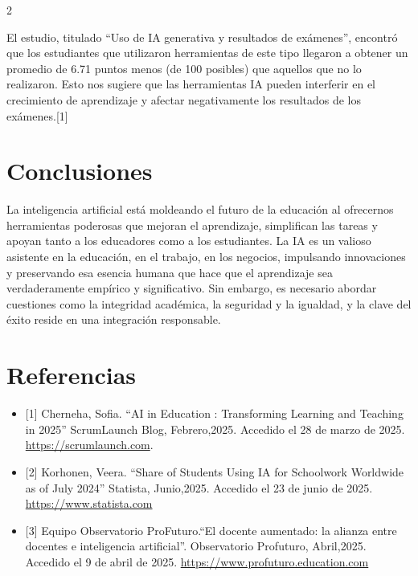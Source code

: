 \documentclass[12pt,spanish,Letterpaper,openany]{book}
\begin{document}
\begin {multicols}{2}
\begin {flushleft}
\begin{minipage}[c]{\columnwidth}
\end{minipage}
\end {flushleft}

El estudio, titulado ``Uso de IA generativa y resultados de exámenes'', encontró que los estudiantes que utilizaron herramientas de este tipo llegaron a obtener un promedio de 6.71 puntos menos (de 100 posibles) que aquellos que no lo realizaron. Esto nos sugiere que las herramientas IA pueden interferir en el crecimiento de aprendizaje y afectar negativamente los resultados de los exámenes.{[}1{]}

\bigskip
\bigskip

\section{Conclusiones}\label{conclusiones}

La inteligencia artificial está moldeando el futuro de la educación al ofrecernos herramientas poderosas que mejoran el aprendizaje, simplifican las tareas y apoyan tanto a los educadores como a los estudiantes. La IA es un valioso asistente en la educación, en el trabajo, en los negocios, impulsando innovaciones y preservando esa esencia humana que hace que el aprendizaje sea verdaderamente empírico y significativo. Sin embargo, es necesario abordar cuestiones como la integridad académica, la seguridad y la igualdad, y la clave del éxito reside en una integración responsable.

\section{Referencias}\label{referencias}

\begin{itemize}
\item
  {[}1{]} Cherneha, Sofia. ``AI in Education : Transforming Learning and Teaching in 2025'' ScrumLaunch Blog, Febrero,2025. Accedido el 28 de marzo de 2025. \href{https://www.scrumlaunch.com/blog/ai-in-education-transforming-learning-and-teaching-in-2025}{https://scrumlaunch.com}.
\item
  {[}2{]} Korhonen, Veera. ``Share of Students Using IA for Schoolwork Worldwide as of July 2024'' Statista, Junio,2025. Accedido el 23 de junio de 2025. \href{https://www.statista.com/statistics/1498309/usage-of-ai-by-students-worldwide/}{https://www.statista.com}
\item
  {[}3{]} Equipo Observatorio ProFuturo.``El docente aumentado: la alianza entre docentes e inteligencia artificial''. Observatorio Profuturo, Abril,2025. Accedido el 9 de abril de 2025. \href{https://profuturo.education/observatorio/tendencias/el-docente-aumentado-la-alianza-entre-docentes-e-inteligencia-artificial/}{https://www.profuturo.education.com}
\end{itemize}

\end {multicols}
\end{document}
